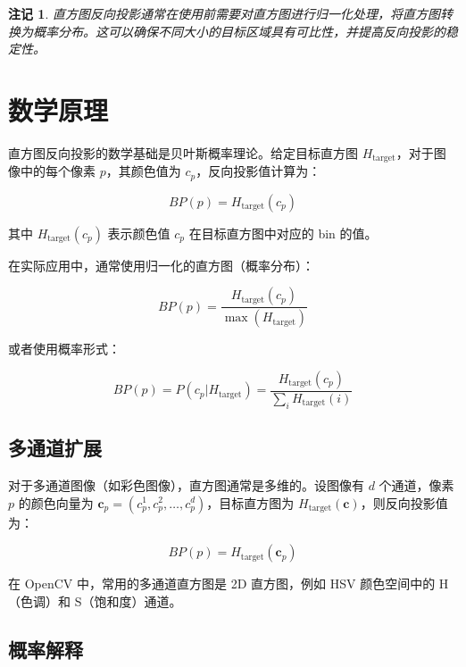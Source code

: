 \documentclass{article}
\newtheorem{remark}{注记}[section]
\begin{document}
\begin{remark}
直方图反向投影通常在使用前需要对直方图进行归一化处理，将直方图转换为概率分布。这可以确保不同大小的目标区域具有可比性，并提高反向投影的稳定性。
\end{remark}

\section{数学原理}

直方图反向投影的数学基础是贝叶斯概率理论。给定目标直方图 $H_{\text{target}}$，对于图像中的每个像素 $p$，其颜色值为 $c_p$，反向投影值计算为：

\begin{equation}
BP(p) = H_{\text{target}}(c_p)
\end{equation}

其中 $H_{\text{target}}(c_p)$ 表示颜色值 $c_p$ 在目标直方图中对应的 bin 的值。

在实际应用中，通常使用归一化的直方图（概率分布）：

\begin{equation}
BP(p) = \frac{H_{\text{target}}(c_p)}{\max(H_{\text{target}})}
\end{equation}

或者使用概率形式：

\begin{equation}
BP(p) = P(c_p | H_{\text{target}}) = \frac{H_{\text{target}}(c_p)}{\sum_{i} H_{\text{target}}(i)}
\end{equation}

\subsection{多通道扩展}

对于多通道图像（如彩色图像），直方图通常是多维的。设图像有 $d$ 个通道，像素 $p$ 的颜色向量为 $\mathbf{c}_p = (c_p^1, c_p^2, \ldots, c_p^d)$，目标直方图为 $H_{\text{target}}(\mathbf{c})$，则反向投影值为：

\begin{equation}
BP(p) = H_{\text{target}}(\mathbf{c}_p)
\end{equation}

在 OpenCV 中，常用的多通道直方图是 2D 直方图，例如 HSV 颜色空间中的 H（色调）和 S（饱和度）通道。

\subsection{概率解释}
\end{document}
